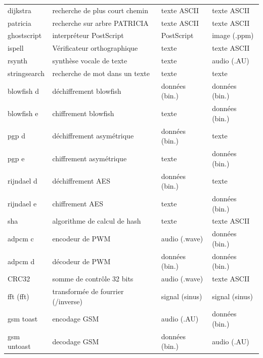 \documentclass[french, a4paper, 11pt, twoside, pdftex]{StyleThese}
\begin{document}
\begin{longtable}{@{}llll@{}}
		dijkstra     & recherche de plus court chemin		& texte ASCII        & texte ASCII      \\
		patricia     & recherche sur arbre PATRICIA			& texte ASCII        & texte ASCII      \\
		ghostscript  & interpréteur PostScript              & PostScript		 & image (.ppm)     \\
		ispell       & Vérificateur orthographique          & texte              & texte ASCII		\\
		rsynth       & synthèse vocale de texte             & texte              & audio (.AU)      \\
		stringsearch & recherche de mot dans un texte		& texte              & texte            \\
		blowfish d   & déchiffrement blowfish               & données (bin.)  	 & données (bin.)   \\
		blowfish e   & chiffrement blowfish                 & texte              & données (bin.)   \\
		pgp d        & déchiffrement asymétrique      		& données (bin.)  	 & texte            \\
		pgp e        & chiffrement asymétrique				& texte              & données (bin.)   \\
		rijndael d   & déchiffrement AES                    & données (bin.)  	 & texte            \\
		rijndael e   & chiffrement AES                      & texte              & données (bin.)   \\
		sha          & algorithme de calcul de hash			& texte              & texte ASCII      \\
		adpcm c      & encodeur de PWM                      & audio (.wave)      & données (bin.)   \\
		adpcm d      & décodeur de PWM                      & données (bin.)  	 & données (bin.)   \\
		CRC32        & somme de contrôle 32 bits     		& audio (.wave)      & texte ASCII      \\
  	fft (fft\up{-1}) & transformée de fourrier (/inverse)	& signal (sinus)	 & signal (sinus)	\\ 
		gsm toast    & encodage GSM                         & audio (.AU)        & données (bin.)   \\ 
		gsm untoast  & decodage GSM                         & données (bin.)     & audio (.AU)	    \\ 		
\end{longtable}
    
\end{document}
